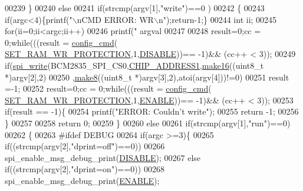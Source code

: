 \begin{DoxyCode}
{{{{00239      \}
00240      \textcolor{keywordflow}{else} 
00241      \textcolor{keywordflow}{if}(strcmp(argv[1],\textcolor{stringliteral}{"write"})==0 )
00242      \{
00243         \textcolor{keywordflow}{if}(argc<4)\{printf(\textcolor{stringliteral}{"\(\backslash\)nCMD ERROR: WR\(\backslash\)n"});\textcolor{keywordflow}{return}-1;\}
00244     \textcolor{keywordtype}{int} ii;
00245        \textcolor{keywordflow}{for}(ii=0;ii<argc;ii++)
00246             printf(\textcolor{stringliteral}{" argval %
00247         
00248         result=0;cc = 0;\textcolor{keywordflow}{while}(((result = \hyperlink{a00005_ga369ee0e8379941cbc2c79b90ec3292da}{config\_cmd}(
      \hyperlink{a00043_a5b534b9caab512045a6e762f3930a501}{SET\_RAM\_WR\_PROTECTION},1,\hyperlink{a00037_a99496f7308834e8b220f7894efa0b6ab}{DISABLE}))== -1)&& (cc++ < 3)); 
00249         \textcolor{keywordflow}{if}(\hyperlink{a00007_ga2770219ad8ad1eda1817c0df934b47d0}{spi\_write}(BCM2835\_SPI\_CS0,\hyperlink{a00037_a94de2b046db6e10257ef4481c0a15eaa}{CHIP\_ADDRESS1},\hyperlink{a00009_ga1e74920f34a07a82cca58eab71ed12b3}{make16}((uint8\_t *)argv[2],2)
00250         ,\hyperlink{a00009_gaefa26c3e5b22ccbe5de1c33305f20e1b}{make8}((uint8\_t *)argv[3],2),atoi(argv[4]))!=0)
00251           result =-1;
00252          result=0;cc = 0;\textcolor{keywordflow}{while}(((result = \hyperlink{a00005_ga369ee0e8379941cbc2c79b90ec3292da}{config\_cmd}(
      \hyperlink{a00043_a5b534b9caab512045a6e762f3930a501}{SET\_RAM\_WR\_PROTECTION},1,\hyperlink{a00037_a514ad415fb6125ba296793df7d1a468a}{ENABLE}))== -1)&& (cc++ < 3)); 
00253          \textcolor{keywordflow}{if}(result == -1)\{
00254                     printf(\textcolor{stringliteral}{"ERROR: Couldn't write"});  
00255                       \textcolor{keywordflow}{return} -1;
00256          \}
00257          
00258      \textcolor{keywordflow}{return} 0;
00259      \}
00260      \textcolor{keywordflow}{else}
00261      \textcolor{keywordflow}{if}(strcmp(argv[1],\textcolor{stringliteral}{"run"})==0) 
00262      \{
00263 \textcolor{preprocessor}{        #ifdef DEBUG}
00264 \textcolor{preprocessor}{}        \textcolor{keywordflow}{if}(argc >=3)\{
00265            \textcolor{keywordflow}{if}((strcmp(argv[2],\textcolor{stringliteral}{"dprint=off"})==0))
00266                spi\_enable\_msg\_debug\_print(\hyperlink{a00037_a99496f7308834e8b220f7894efa0b6ab}{DISABLE});
00267             \textcolor{keywordflow}{else} \textcolor{keywordflow}{if}((strcmp(argv[2],\textcolor{stringliteral}{"dprint=on"})==0))
00268                 spi\_enable\_msg\_debug\_print(\hyperlink{a00037_a514ad415fb6125ba296793df7d1a468a}{ENABLE});
}}}}}
\end{DoxyCode}
